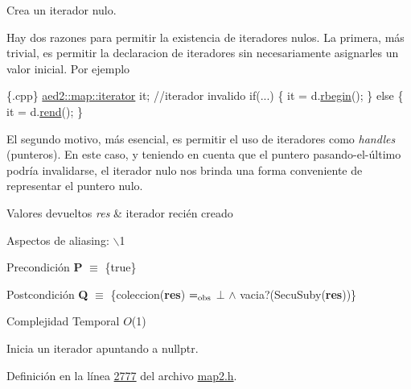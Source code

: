 \-Crea un iterador nulo. 

\-Hay dos razones para permitir la existencia de iteradores nulos. \-La primera, más trivial, es permitir la declaracion de iteradores sin necesariamente asignarles un valor inicial. \-Por ejemplo 
\begin{DoxyCode}
 \{.cpp\}
 \hyperlink{classaed2_1_1map_1_1iterator}{aed2::map::iterator} it;   \textcolor{comment}{//iterador invalido}
 \textcolor{keywordflow}{if}(...) \{
   it = d.\hyperlink{classaed2_1_1map_ac412d3902112122c1bffe2d4283a4e9d_ac412d3902112122c1bffe2d4283a4e9d}{rbegin}();
 \} \textcolor{keywordflow}{else} \{
   it = d.\hyperlink{classaed2_1_1map_a277f03b4f4b6b98879e4e4921081801f_a277f03b4f4b6b98879e4e4921081801f}{rend}();
 \}
\end{DoxyCode}
 \-El segundo motivo, más esencial, es permitir el uso de iteradores como {\itshape handles\/} (punteros). \-En este caso, y teniendo en cuenta que el puntero pasando-\/el-\/último podría invalidarse, el iterador nulo nos brinda una forma conveniente de representar el puntero nulo.


\begin{DoxyRetVals}{\-Valores devueltos}
{\em res} & iterador recién creado\\
\hline
\end{DoxyRetVals}
\begin{DoxyParagraph}{\-Aspectos de aliasing\-:}
$\backslash$1
\end{DoxyParagraph}
\begin{DoxyPrecond}{\-Precondición}
{\bfseries \-P} $\equiv$ \{true\} 
\end{DoxyPrecond}
\begin{DoxyPostcond}{\-Postcondición}
{\bfseries \-Q} $\equiv$ \{coleccion({\bfseries res}) $=_{\rm obs}$ $\bot$ $\land$ vacia?(\-Secu\-Suby({\bfseries res}))\}
\end{DoxyPostcond}

\begin{DoxyDescription}
\item[\-Complejidad \-Temporal]$O$(1)
\end{DoxyDescription}

\-Inicia un iterador apuntando a nullptr. 

\-Definición en la línea \hyperlink{map2_8h_source_l02777}{2777} del archivo \hyperlink{map2_8h_source}{map2.\-h}.

